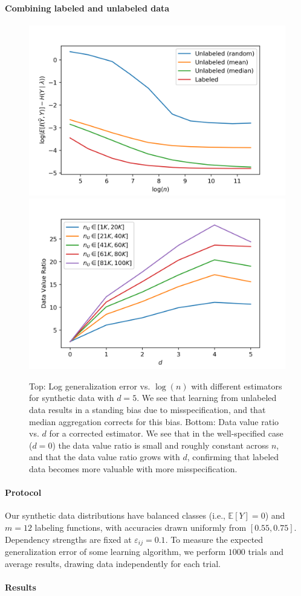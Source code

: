 \paragraph{Combining labeled and unlabeled data}

\begin{figure}
    \centering
    \includegraphics[width=.4\textwidth]{figures/misspecified_vary_n.png}
    \includegraphics[width=.4\textwidth]{figures/data_value_ratio.png}
    \caption{Top: Log generalization error vs. $\log(n)$ with different estimators for synthetic data with $d=5$. We see that learning from unlabeled data results in a standing bias due to misspecification, and that median aggregation corrects for this bias. Bottom: Data value ratio vs. $d$ for a corrected estimator. We see that in the well-specified case ($d=0$) the data value ratio is small and roughly constant across $n$, and that the data value ratio grows with $d$, confirming that labeled data becomes more valuable with more misspecification.}
    \label{fig:ldvr_property}
\end{figure}

\paragraph{Protocol}

Our synthetic data distributions have balanced classes (i.e., $\mathbb{E}[Y]=0$) and $m=12$ labeling functions, with accuracies drawn uniformly from $[0.55, 0.75]$. Dependency strengths are fixed at $\varepsilon_{ij}=0.1$. To measure the expected generalization error of some learning algorithm, we perform $1000$ trials and average results, drawing data independently for each trial.

\paragraph{Results}

